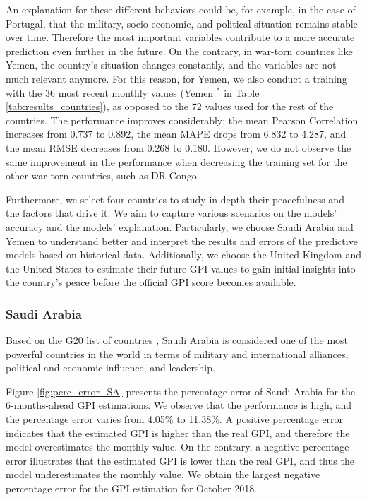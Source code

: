 \documentclass{bmcart}
\begin{document}
An explanation for these different behaviors could be, for example, in the case of Portugal, that the military, socio-economic, and political situation remains stable over time. Therefore the most important variables contribute to a more accurate prediction even further in the future. 
On the contrary, in war-torn countries like Yemen, the country's situation changes constantly, and the variables are not much relevant anymore. 
For this reason, for Yemen, we also conduct a training with the 36 most recent monthly values (Yemen $^*$ in Table \ref{tab:results_countries}), as opposed to the 72 values used for the rest of the countries. 
The performance improves considerably: the mean Pearson Correlation increases from 0.737 to 0.892, the mean MAPE drops from 6.832 to 4.287, and the mean RMSE decreases from 0.268 to 0.180. However, we do not observe the same improvement in the performance when decreasing the training set for the other war-torn countries, such as DR Congo.

Furthermore, we select four countries to study in-depth their peacefulness and the factors that drive it. We aim to capture
various scenarios on the models' accuracy and the models' explanation. Particularly, we choose Saudi Arabia and Yemen
to understand better and interpret the results and errors of the predictive models based on historical data. Additionally, we choose the United Kingdom and the United States to estimate their future GPI values to gain initial insights into the country's peace before the official GPI score becomes available.

\subsubsection*{\textbf{Saudi Arabia}}
\label{section:SA_cs}

Based on the G20 list of countries \cite{cooper2013group}, Saudi Arabia is considered one of the most powerful countries in the world in terms of military and international alliances, political and economic influence, and leadership. 

Figure \ref{fig:perc_error_SA} presents the percentage error of Saudi Arabia for the 6-months-ahead GPI estimations. 
We observe that the performance is high, and the percentage error varies from 4.05\% to 11.38\%. 
A positive percentage error indicates that the estimated GPI is higher than the real GPI, and therefore the model overestimates the monthly value. On the contrary, a negative percentage error illustrates that the estimated GPI is lower than the real GPI, and thus the model underestimates the monthly value. We obtain the largest negative percentage error for the GPI estimation for October 2018.
\end{document}
